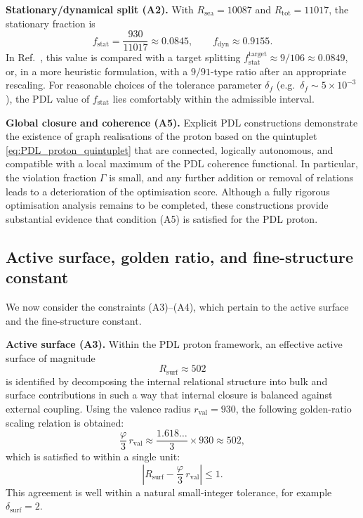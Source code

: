 \documentclass[11pt,a4paper]{article}
\theoremstyle{definition}
\begin{document}
\medskip
\noindent\textbf{Stationary/dynamical split (A2).} With $R_{\mathrm{sea}}=10087$ and $R_{\mathrm{tot}}=11017$, the stationary fraction is
\[
 f_{\mathrm{stat}} = \frac{930}{11017} \approx 0.0845, \qquad
 f_{\mathrm{dyn}} \approx 0.9155.
\]
In Ref.~\cite{Combinatorial_Proton_v2_2026}, this value is compared with a target splitting $f_{\mathrm{stat}}^{\mathrm{target}} \approx 9/106 \approx 0.0849$, or, in a more heuristic formulation, with a $9/91$-type ratio after an appropriate rescaling.\cite{PDL_Global_Mapping_2026} For reasonable choices of the tolerance parameter $\delta_f$ (e.g.\ $\delta_f \sim 5\times 10^{-3}$), the PDL value of $f_{\mathrm{stat}}$ lies comfortably within the admissible interval.

\medskip
\noindent\textbf{Global closure and coherence (A5).} Explicit PDL constructions demonstrate the existence of graph realisations of the proton based on the quintuplet \eqref{eq:PDL_proton_quintuplet} that are connected, logically autonomous, and compatible with a local maximum of the PDL coherence functional. In particular, the violation fraction $\Gamma$ is small, and any further addition or removal of relations leads to a deterioration of the optimisation score.\cite{PDL_Main_2026,Combinatorial_Proton_v2_2026,PDL_Global_Mapping_2026} Although a fully rigorous optimisation analysis remains to be completed, these constructions provide substantial evidence that condition (A5) is satisfied for the PDL proton.

\subsection{Active surface, golden ratio, and fine-structure constant}

We now consider the constraints (A3)–(A4), which pertain to the active surface and the fine-structure constant.

\medskip
\noindent\textbf{Active surface (A3).} Within the PDL proton framework, an effective active surface of magnitude
\[
 R_{\mathrm{surf}} \approx 502
\]
is identified by decomposing the internal relational structure into bulk and surface contributions in such a way that internal closure is balanced against external coupling.\cite{Combinatorial_Proton_v2_2026,Effective_Fields_PDL_2026} Using the valence radius $r_{\mathrm{val}}=930$, the following golden-ratio scaling relation is obtained:
\[
 \frac{\varphi}{3}\, r_{\mathrm{val}} \approx \frac{1.618\ldots}{3}\times 930 \approx 502,
\]
which is satisfied to within a single unit:
\[
 \left| R_{\mathrm{surf}} - \frac{\varphi}{3}\, r_{\mathrm{val}} \right| \leq 1.
\]
This agreement is well within a natural small-integer tolerance, for example $\delta_{\mathrm{surf}}=2$.\cite{Golden_Ratio_Sketch_2026,Alpha_PDL_v2_2026}
\end{document}
